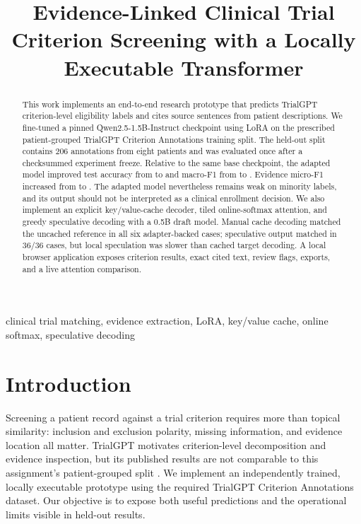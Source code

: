 ﻿\documentclass[conference]{IEEEtran}
\title{Evidence-Linked Clinical Trial Criterion Screening with a Locally Executable Transformer}
\author{\IEEEauthorblockN{Ahmed Laiq}\IEEEauthorblockA{Individual student research project}}
\begin{document}
\maketitle

\begin{abstract}
This work implements an end-to-end research prototype that predicts TrialGPT criterion-level eligibility labels and cites source sentences from patient descriptions. We fine-tuned a pinned Qwen2.5-1.5B-Instruct checkpoint using LoRA on the prescribed patient-grouped TrialGPT Criterion Annotations training split. The held-out split contains 206 annotations from eight patients and was evaluated once after a checksummed experiment freeze. Relative to the same base checkpoint, the adapted model improved test accuracy from \BaseAccuracy{} to \AdaptedAccuracy{} and macro-F1 from \BaseMacroF{} to \AdaptedMacroF{}. Evidence micro-F1 increased from \BaseEvidenceF{} to \AdaptedEvidenceF{}. The adapted model nevertheless remains weak on minority labels, and its output should not be interpreted as a clinical enrollment decision. We also implement an explicit key/value-cache decoder, tiled online-softmax attention, and greedy speculative decoding with a 0.5B draft model. Manual cache decoding matched the uncached reference in all six adapter-backed cases; speculative output matched in 36/36 cases, but local speculation was slower than cached target decoding. A local browser application exposes criterion results, exact cited text, review flags, exports, and a live attention comparison.
\end{abstract}

\begin{IEEEkeywords}
clinical trial matching, evidence extraction, LoRA, key/value cache, online softmax, speculative decoding
\end{IEEEkeywords}

\section{Introduction}
Screening a patient record against a trial criterion requires more than topical similarity: inclusion and exclusion polarity, missing information, and evidence location all matter. TrialGPT motivates criterion-level decomposition and evidence inspection, but its published results are not comparable to this assignment's patient-grouped split \cite{jin2024trialgpt}. We implement an independently trained, locally executable prototype using the required TrialGPT Criterion Annotations dataset. Our objective is to expose both useful predictions and the operational limits visible in held-out results.
\end{document}
